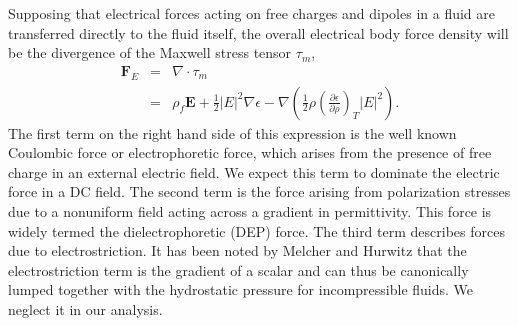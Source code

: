 \documentclass[aip,reprint, floatfix]{revtex4-1}
\begin{document}
Supposing that electrical forces acting on free charges and dipoles in a fluid are transferred directly to the fluid itself, the overall electrical body force density will be the divergence of the Maxwell stress tensor $\tau_m $,
\begin{eqnarray} \label{e_force}
 \mathbf{F}_E &=& \nabla \cdot \tau_m \nonumber \\ 
 &=& \rho_f \mathbf{E} + \frac{1}{2} \left| E \right|^2 \nabla \epsilon - \nabla \left( \frac{1}{2} \rho \left( \frac{\partial \epsilon}{\partial \rho} \right)_T \left| E \right|^2 \right) .
\end{eqnarray}
The first term on the right hand side of this expression is the well known Coulombic force or electrophoretic force, which arises from the presence of free charge in an external electric field. We expect this term to dominate the electric force in a DC field. The second term is the force arising from polarization stresses due to a nonuniform field acting across a gradient in permittivity. This force is widely termed the dielectrophoretic (DEP) force. The third term describes forces due to electrostriction. It has been noted by Melcher and Hurwitz \cite{hurwitz_electrohydrodynamic_1966} that the electrostriction term is the gradient of a scalar and can thus be canonically lumped together with the hydrostatic pressure for incompressible fluids. We neglect it in our analysis. 
\end{document}
